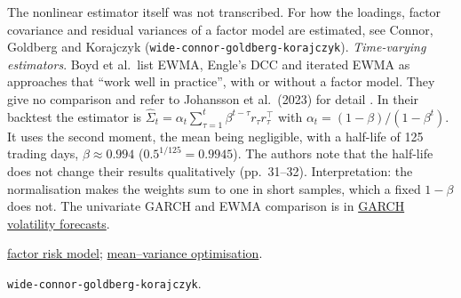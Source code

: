 \begin{qfmethod}
 The nonlinear estimator itself was not transcribed. For how the loadings, factor covariance and residual variances of a factor model are estimated, see Connor, Goldberg and Korajczyk (\nolinkurl{wide-connor-goldberg-korajczyk}). \emph{Time-varying estimators}. Boyd et al.\ list EWMA, Engle's DCC and iterated EWMA as approaches that ``work well in practice'', with or without a factor model. They give no comparison and refer to Johansson et al.\ (2023) for detail \citep[arXiv v1, sec.~3.4, pp.~21--22]{wide-boyd-markowitz-seventy}. In their backtest the estimator is $\hat\Sigma_t=\alpha_t\sum_{\tau=1}^t\beta^{t-\tau}r_\tau r_\tau^\top$ with $\alpha_t=(1-\beta)/(1-\beta^t)$. It uses the second moment, the mean being negligible, with a half-life of 125 trading days, $\beta\approx0.994$ ($0.5^{1/125}=0.9945$). The authors note that the half-life does not change their results qualitatively (pp.~31--32). Interpretation: the normalisation makes the weights sum to one in short samples, which a fixed $1-\beta$ does not. The univariate GARCH and EWMA comparison is in \hyperref[mod:garch-volatility-forecast]{GARCH volatility forecasts}.

 \hyperref[mod:factor-risk-model]{factor risk model}; \hyperref[mod:mean-variance-portfolio-optimisation]{mean--variance optimisation}.

 \nolinkurl{wide-connor-goldberg-korajczyk}.

\end{qfmethod}


